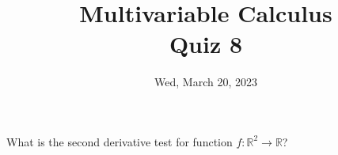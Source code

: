 \documentclass[aspectratio=169]{beamer}
\title{ Multivariable Calculus \\ Quiz 8}
\institute{Fulbright University Vietnam}
\date{Wed, March 20, 2023}
\begin{document}
\maketitle

\begin{frame}
    What is the second derivative test for function $f: \mathbb{R}^2 \to \mathbb{R}$?
\end{frame}
\end{document}
